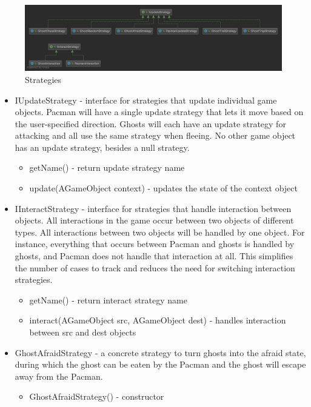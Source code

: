 \documentclass[letterpaper, 11pt]{article}
\begin{document}
\begin{figure}[htbp] 
  \centering
  \includegraphics[width=0.98\linewidth]{strategy.png} 
  \caption{Strategies}
  \label{figstrategy} 
\end{figure}


\begin{itemize}
  \item IUpdateStrategy - interface for strategies that update individual game objects. Pacman will have a single update strategy that lets it move based on the user-specified direction. Ghosts will each have an update strategy for attacking and all use the same strategy when fleeing. No other game object has an update strategy, besides a null strategy.
  \begin{itemize}
    \item getName() - return update strategy name
    \item update(AGameObject context) - updates the state of the context object
  \end{itemize}  
  \item IInteractStrategy - interface for strategies that handle interaction between objects. All interactions in the game occur between two objects of different types. All interactions between two objects will be handled by one object. For instance, everything that occurs between Pacman and ghosts is handled by ghosts, and Pacman does not handle that interaction at all. This simplifies the number of cases to track and reduces the need for switching interaction strategies.
  \begin{itemize}
    \item getName() - return interact strategy name
    \item interact(AGameObject src, AGameObject dest) - handles interaction between src and dest objects
  \end{itemize}
  \item GhostAfraidStrategy - a concrete strategy to turn ghosts into the afraid state, during which the ghost can be eaten by the Pacman and the ghost will escape away from the Pacman.
  \begin{itemize}
  \item GhostAfraidStrategy() - constructor

\end{itemize}
\end{itemize}
\end{document}
